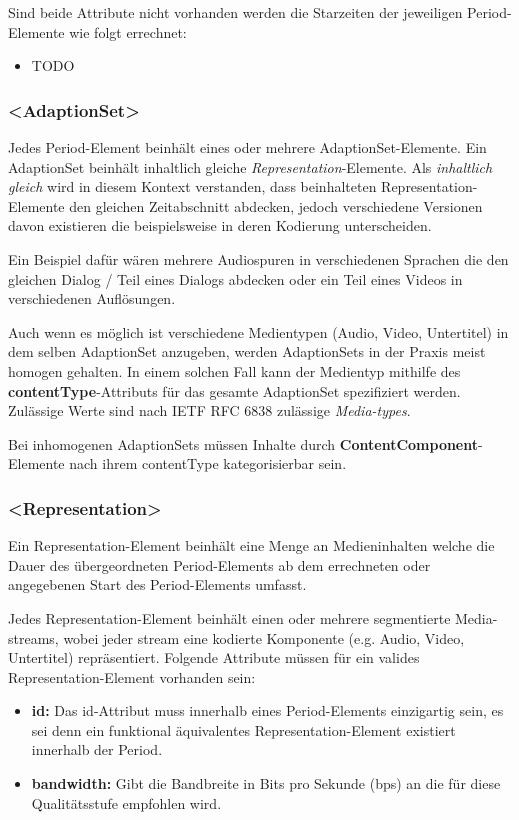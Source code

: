 \documentclass[paper = a4, fontsize = 12pt, parskip = half]{scrartcl} %
\begin{document}
Sind beide Attribute nicht vorhanden werden die Starzeiten der jeweiligen Period-Elemente wie folgt errechnet:

\begin{itemize}
	\item TODO
\end{itemize}

\subsubsection{<AdaptionSet>}
Jedes Period-Element beinhält eines oder mehrere AdaptionSet-Elemente. Ein AdaptionSet beinhält inhaltlich gleiche \textit{Representation}-Elemente. Als \textit{inhaltlich gleich} wird in diesem Kontext verstanden, dass beinhalteten Representation-Elemente den gleichen Zeitabschnitt abdecken, jedoch verschiedene Versionen davon existieren die beispielsweise in deren Kodierung unterscheiden.

Ein Beispiel dafür wären mehrere Audiospuren in verschiedenen Sprachen die den gleichen Dialog / Teil eines Dialogs abdecken oder ein Teil eines Videos in verschiedenen Auflösungen.

Auch wenn es möglich ist verschiedene Medientypen (Audio, Video, Untertitel) in dem selben AdaptionSet anzugeben, werden AdaptionSets in der Praxis meist homogen gehalten. In einem solchen Fall kann der Medientyp mithilfe des \textbf{contentType}-Attributs für das gesamte AdaptionSet spezifiziert werden. Zulässige Werte sind nach IETF RFC 6838 zulässige \textit{Media-types}.

Bei inhomogenen AdaptionSets müssen Inhalte durch \textbf{ContentComponent}-Elemente nach ihrem contentType kategorisierbar sein.

\subsubsection{<Representation>}
Ein Representation-Element beinhält eine Menge an Medieninhalten welche die Dauer des übergeordneten Period-Elements ab dem errechneten oder angegebenen Start des Period-Elements umfasst.

Jedes Representation-Element beinhält einen oder mehrere segmentierte Media-streams, wobei jeder stream eine kodierte Komponente (e.g. Audio, Video, Untertitel) repräsentiert. Folgende Attribute müssen für ein valides Representation-Element vorhanden sein:

\begin{itemize}
	\item \textbf{id:} Das id-Attribut muss innerhalb eines Period-Elements einzigartig sein, es sei denn ein funktional äquivalentes Representation-Element existiert innerhalb der Period.
	\item \textbf{bandwidth:} Gibt die Bandbreite in Bits pro Sekunde (bps) an die für diese Qualitätsstufe empfohlen wird.
\end{itemize}
\end{document}
